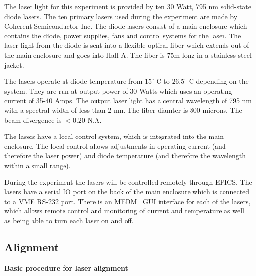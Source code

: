 {The laser light for this experiment is provided by ten 30 Watt, 795
nm solid-state diode lasers.  The ten primary lasers used during the
experiment are made by Coherent Semiconductor Inc. 
The diode lasers consist of a main enclosure which contains the diode,
power supplies, fans and control systems for the laser.  The laser
light from the diode is sent into a flexible optical fiber which
extends out of the main enclosure and goes into Hall A. 
The fiber is 75m long in a stainless steel jacket.

The lasers operate at diode temperature from $15^{\circ}$ C to
$26.5^{\circ}$ C depending on the system.  They are run at output
power of 30 Watts which uses an operating current of 35-40 Amps.  The
output laser light has a central wavelength of 795 nm with a spectral
width of less than 2 nm. The fiber diamter is 800 microns.  The beam
divergence is $< 0.20$ N.A.

The lasers have a local control system, which is integrated into the
main enclosure.  The local control allows adjustments in operating
current (and therefore the laser power) and diode temperature (and
therefore the wavelength within a small range).

During the experiment the lasers will be controlled remotely through
 EPICS.  The lasers have a serial IO port on the back of the main
 enclosure which is connected to a VME RS-232 port.  There is an
 MEDM~\cite{MEDMwww} GUI interface for each of the lasers, which
 allows remote control and monitoring of current and temperature as
 well as being able to turn each laser on and off.


\subsection{Alignment}

\noindent
{\bf{Basic procedure for laser alignment}}


}

